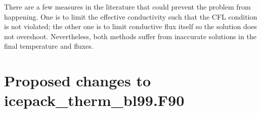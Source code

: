 \documentclass[10pt,letterpaper,oneside]{article}
\begin{document}
There are a few measures in the literature that could prevent the problem from happening. One is to limit the effective conductivity such that the CFL condition is not violated; the other one is to limit conductive flux itself so the solution does not overshoot. Nevertheless, both methods suffer from inaccurate solutions in the final temperature and fluxes.      



\section{Proposed changes to \textbf{icepack\_therm\_bl99.F90}}
\end{document}
